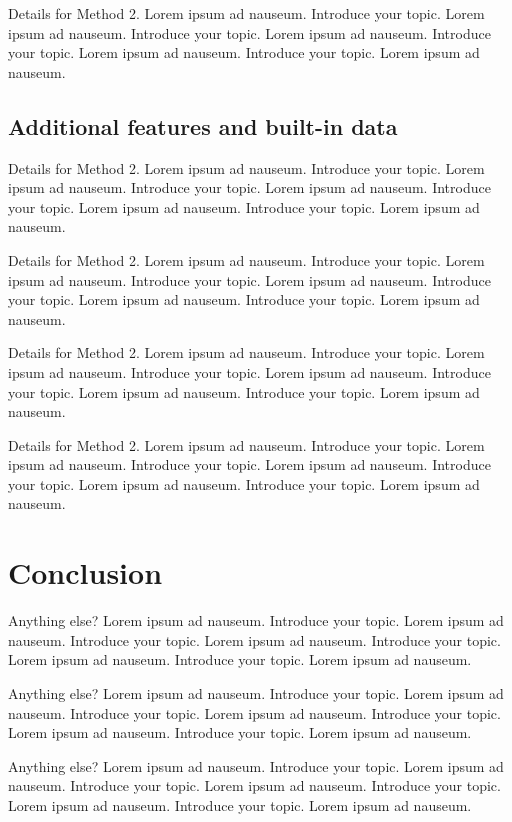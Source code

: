 \documentclass{bioinfo}
\begin{document}
Details for Method 2. Lorem ipsum ad nauseum. Introduce your topic.
Lorem ipsum ad nauseum. Introduce your topic. Lorem ipsum ad nauseum.
Introduce your topic. Lorem ipsum ad nauseum. Introduce your topic.
Lorem ipsum ad nauseum.

\subsection{Additional features and built-in data}

Details for Method 2. Lorem ipsum ad nauseum. Introduce your topic.
Lorem ipsum ad nauseum. Introduce your topic. Lorem ipsum ad nauseum.
Introduce your topic. Lorem ipsum ad nauseum. Introduce your topic.
Lorem ipsum ad nauseum.

Details for Method 2. Lorem ipsum ad nauseum. Introduce your topic.
Lorem ipsum ad nauseum. Introduce your topic. Lorem ipsum ad nauseum.
Introduce your topic. Lorem ipsum ad nauseum. Introduce your topic.
Lorem ipsum ad nauseum.

Details for Method 2. Lorem ipsum ad nauseum. Introduce your topic.
Lorem ipsum ad nauseum. Introduce your topic. Lorem ipsum ad nauseum.
Introduce your topic. Lorem ipsum ad nauseum. Introduce your topic.
Lorem ipsum ad nauseum.

Details for Method 2. Lorem ipsum ad nauseum. Introduce your topic.
Lorem ipsum ad nauseum. Introduce your topic. Lorem ipsum ad nauseum.
Introduce your topic. Lorem ipsum ad nauseum. Introduce your topic.
Lorem ipsum ad nauseum.

\section{Conclusion}

Anything else? Lorem ipsum ad nauseum. Introduce your topic. Lorem ipsum
ad nauseum. Introduce your topic. Lorem ipsum ad nauseum. Introduce your
topic. Lorem ipsum ad nauseum. Introduce your topic. Lorem ipsum ad
nauseum.

Anything else? Lorem ipsum ad nauseum. Introduce your topic. Lorem ipsum
ad nauseum. Introduce your topic. Lorem ipsum ad nauseum. Introduce your
topic. Lorem ipsum ad nauseum. Introduce your topic. Lorem ipsum ad
nauseum.

Anything else? Lorem ipsum ad nauseum. Introduce your topic. Lorem ipsum
ad nauseum. Introduce your topic. Lorem ipsum ad nauseum. Introduce your
topic. Lorem ipsum ad nauseum. Introduce your topic. Lorem ipsum ad
nauseum.
\end{document}
